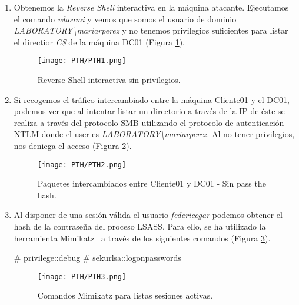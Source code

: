 \begin{enumerate}
\item Obtenemos la {\it Reverse Shell} interactiva en la máquina atacante. Ejecutamos el comando {\it whoami} y vemos que somos el usuario de dominio {\it LABORATORY\textbackslash{}mariarperez} y no tenemos privilegios suficientes para listar el directior {\it C\$} de la máquina DC01 (Figura \ref{PTH1}).
\begin{figure}[H] %
\begin{center}
\texttt{[image: PTH/PTH1.png]}
\end{center}
\caption{Reverse Shell interactiva sin privilegios.}
\label{PTH1}
\end{figure}

\item Si recogemos el tráfico intercambiado entre la máquina Cliente01 y el DC01, podemos ver que al intentar listar un directorio a través de la IP de éste se realiza a través del protocolo SMB utilizando el protocolo de autenticación NTLM donde el user es {\it LABORATORY\textbackslash{}mariarperez}. Al no tener privilegios, nos deniega el acceso (Figura \ref{PTH2}).
\begin{figure}[H] %
\begin{center}
\texttt{[image: PTH/PTH2.png]}
\end{center}
\caption{Paquetes intercambiados entre Cliente01 y DC01 - Sin pass the hash.}
\label{PTH2}
\end{figure}

\item  Al disponer de una sesión válida el usuario {\it federicogar} podemos obtener el hash de la contraseña del proceso LSASS. Para ello, se ha utilizado la herramienta Mimikatz~\cite{Capitulo5:Mimikatz} a través de los siguientes comandos (Figura \ref{PTH3}).
\begin{listing}[style=consola, numbers=none]
# privilege::debug
# sekurlsa::logonpasswords
\end{listing}

\begin{figure}[H] %
\begin{center}
\texttt{[image: PTH/PTH3.png]}
\end{center}
\caption{Comandos Mimikatz para listas sesiones activas.}
\label{PTH3}
\end{figure}


\end{enumerate}

